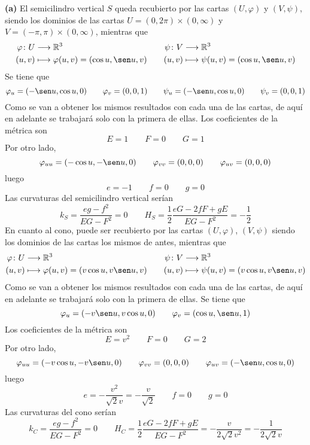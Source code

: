 \documentclass[12pt]{report}
\newcommand{\R}{\mathbb R}
\begin{document}
\vspace{2mm}
\textbf{(a) } El semicilindro vertical $S$ queda recubierto por las cartas $(U,\varphi)$ y $(V, \psi)$, siendo los dominios de las cartas $U = (0,2\pi) \times (0,\infty)$ y $V = (-\pi, \pi) \times (0,\infty)$, mientras que 
\[
\begin{aligned}[t]
    \varphi \colon U &\longrightarrow \R^3 \\
    (u,v) &\longmapsto \varphi(u,v) = (\cos u, \sen u, v)
\end{aligned} \qquad
\begin{aligned}[t]
    \psi \colon V &\longrightarrow \R^3 \\
    (u,v) &\longmapsto \psi(u,v) = (\cos u, \sen u, v)
\end{aligned}
\]
Se tiene que
\[\varphi_u = (-\sen u, \cos u, 0) \qquad \varphi_v = (0,0,1) \qquad \psi_u = (-\sen u, \cos u, 0) \qquad \psi_v = (0,0,1)\]
Como se van a obtener los mismos resultados con cada una de las cartas, de aquí en adelante se trabajará solo con la primera de ellas. Los coeficientes de la métrica son
\[E = 1 \qquad F = 0 \qquad G = 1\]
Por otro lado,
\[\varphi_{uu} = (-\cos u, -\sen u, 0) \qquad \varphi_{vv} = (0,0,0) \qquad \varphi_{uv} = (0,0,0)\]
luego
\[e = -1 \qquad f = 0 \qquad g = 0\]
Las curvaturas del semicilindro vertical serían
\[k_S = \frac{eg-f^2}{EG-F^2} = 0 \qquad H_S = \frac{1}{2}\frac{eG-2fF+gE}{EG-F^2} = -\frac{1}{2}\]
En cuanto al cono, puede ser recubierto por las cartas $(U,\varphi)$, $(V,\psi)$ siendo los dominios de las cartas los mismos de antes, mientras que
\[
\begin{aligned}[t]
    \varphi \colon U &\longrightarrow \R^3 \\
    (u,v) &\longmapsto \varphi(u,v) = (v\cos u, v\sen u, v)
\end{aligned} \qquad
\begin{aligned}[t]
    \psi \colon V &\longrightarrow \R^3 \\
    (u,v) &\longmapsto \psi(u,v) = (v \cos u, v \sen u, v)
\end{aligned}
\]
Como se van a obtener los mismos resultados con cada una de las cartas, de aquí en adelante se trabajará solo con la primera de ellas. Se tiene que
\[\varphi_u = (-v\sen u, v\cos u, 0) \qquad \varphi_v = (\cos u, \sen u, 1)\]
Los coeficientes de la métrica son
\[E = v^2 \qquad F = 0 \qquad G = 2\]
Por otro lado,
\[\varphi_{uu} = (-v\cos u, -v\sen u, 0) \qquad \varphi_{vv} = (0,0,0) \qquad \varphi_{uv} = (-\sen u, \cos u, 0)\]
luego
\[e = -\frac{v^2}{\sqrt{2}v} = -\frac{v}{\sqrt{2}} \qquad f = 0 \qquad g = 0\]
Las curvaturas del cono serían
\[k_C = \frac{eg-f^2}{EG-F^2} = 0 \qquad H_C = \frac{1}{2}\frac{eG-2fF+gE}{EG-F^2} = -\frac{v}{2\sqrt{2}v^2} = -\frac{1}{2\sqrt{2}v}\]
\end{document}
